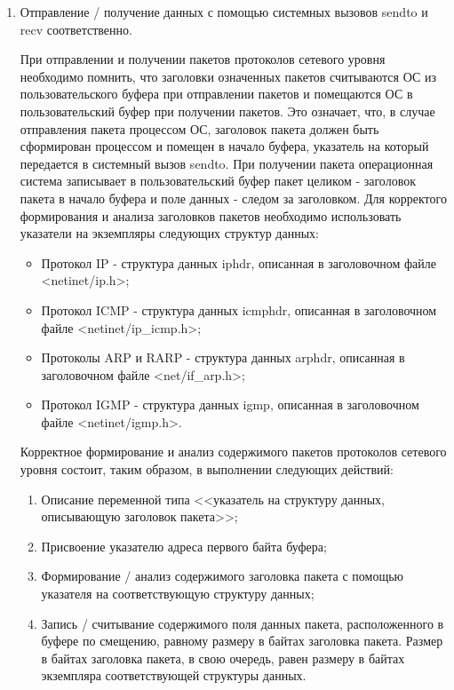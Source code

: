 \begin{enumerate}
		\item Отправление / получение данных с помощью системных вызовов sendto и recv соответственно.

			При отправлении и получении пакетов протоколов сетевого уровня необходимо помнить, что заголовки означенных пакетов
			считываются ОС из пользовательского буфера при отправлении пакетов и помещаются ОС в пользовательский буфер при получении пакетов. Это означает,
			что, в случае отправления пакета процессом ОС, заголовок пакета должен быть сформирован процессом и помещен в начало буфера,
			указатель на который передается в системный вызов sendto. При получении пакета операционная система записывает в пользовательский
			буфер пакет целиком - заголовок пакета в начало буфера и поле данных - следом за заголовком.
			Для корректого формирования и анализа заголовков пакетов необходимо использовать указатели на экземпляры следующих структур данных:

			\begin{itemize}

				\item Протокол IP - структура данных iphdr, описанная в заголовочном файле \linebreak <netinet/ip.h>;
				\item Протокол ICMP - структура данных icmphdr, описанная в заголовочном файле <netinet/ip\_icmp.h>;
				\item Протоколы ARP и RARP - структура данных arphdr, описанная в заголовочном файле <net/if\_arp.h>;
				\item Протокол IGMP - структура данных igmp, описанная в заголовочном файле \linebreak <netinet/igmp.h>.

			\end{itemize}

			Корректное формирование и анализ содержимого пакетов протоколов сетевого уровня состоит, таким образом, в выполнении следующих действий:

			\begin{enumerate}

				\item Описание переменной типа <<указатель на структуру данных, описывающую заголовок пакета>>;
				\item Присвоение указателю адреса первого байта буфера;
				\item Формирование / анализ содержимого заголовка пакета с помощью указателя на соответствующую структуру данных;
				\item Запись / считывание содержимого поля данных пакета, расположенного в буфере по смещению, равному размеру в байтах заголовка пакета.
				Размер в байтах заголовка пакета, в свою очередь, равен размеру в байтах экземпляра соответствующей структуры данных.


\end{enumerate}
\end{enumerate}
